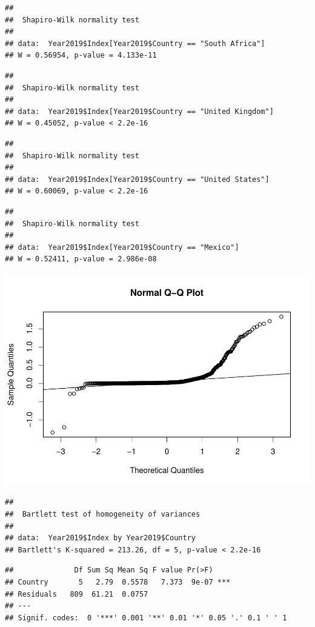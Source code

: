 \documentclass[
  12pt,
]{article}
\begin{document}
\begin{verbatim}
## 
##  Shapiro-Wilk normality test
## 
## data:  Year2019$Index[Year2019$Country == "South Africa"]
## W = 0.56954, p-value = 4.133e-11
\end{verbatim}

\begin{verbatim}
## 
##  Shapiro-Wilk normality test
## 
## data:  Year2019$Index[Year2019$Country == "United Kingdom"]
## W = 0.45052, p-value < 2.2e-16
\end{verbatim}

\begin{verbatim}
## 
##  Shapiro-Wilk normality test
## 
## data:  Year2019$Index[Year2019$Country == "United States"]
## W = 0.60069, p-value < 2.2e-16
\end{verbatim}

\begin{verbatim}
## 
##  Shapiro-Wilk normality test
## 
## data:  Year2019$Index[Year2019$Country == "Mexico"]
## W = 0.52411, p-value = 2.986e-08
\end{verbatim}

\includegraphics{QiuWangXu_ENV872_Finalproject_files/figure-latex/unnamed-chunk-5-1.pdf}

\begin{verbatim}
## 
##  Bartlett test of homogeneity of variances
## 
## data:  Year2019$Index by Year2019$Country
## Bartlett's K-squared = 213.26, df = 5, p-value < 2.2e-16
\end{verbatim}

\begin{verbatim}
##              Df Sum Sq Mean Sq F value Pr(>F)    
## Country       5   2.79  0.5578   7.373  9e-07 ***
## Residuals   809  61.21  0.0757                   
## ---
## Signif. codes:  0 '***' 0.001 '**' 0.01 '*' 0.05 '.' 0.1 ' ' 1
\end{verbatim}
\end{document}
